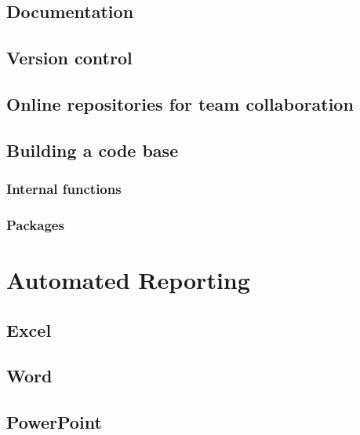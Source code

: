 \documentclass[
]{book}
\begin{document}
\hypertarget{documentation}{%
\section{Documentation}\label{documentation}}

\hypertarget{version-control}{%
\section{Version control}\label{version-control}}

\hypertarget{online-repositories-for-team-collaboration}{%
\section{Online repositories for team collaboration}\label{online-repositories-for-team-collaboration}}

\hypertarget{building-a-code-base}{%
\section{Building a code base}\label{building-a-code-base}}

\hypertarget{internal-functions}{%
\subsection{Internal functions}\label{internal-functions}}

\hypertarget{packages}{%
\subsection{Packages}\label{packages}}

\hypertarget{auto_report}{%
\chapter{Automated Reporting}\label{auto_report}}

\hypertarget{excel}{%
\section{Excel}\label{excel}}

\hypertarget{word}{%
\section{Word}\label{word}}

\hypertarget{powerpoint}{%
\section{PowerPoint}\label{powerpoint}}
\end{document}
